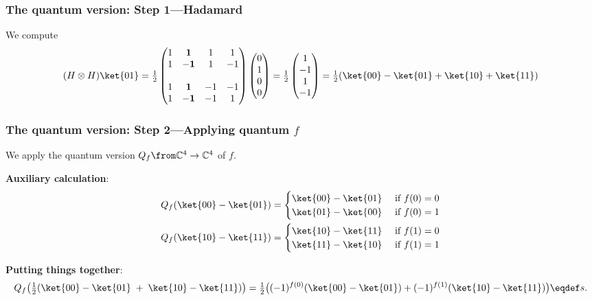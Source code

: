 \documentclass[aspectratio=169, 12pt, final, professionalfont]{beamer}
\begin{document}
\begin{frame}\frametitle{The quantum version: Step 1---Hadamard}
  We compute
  \begin{equation*}
    (H\otimes H) \ket{01}
    =
    \tfrac{1}{2}\begin{pmatrix}
      1 & \mathbf{1}  & 1  & 1 \\
      1 & \mathbf{-1} & 1  & -1 \\\\
      1 & \mathbf{1}  & -1 & -1 \\
      1 & \mathbf{-1} & -1 & 1
    \end{pmatrix}
    \begin{pmatrix}
      0 \\ 1 \\ 0 \\ 0
    \end{pmatrix}
    =\tfrac{1}{2}
    \begin{pmatrix}
      1 \\ -1 \\ 1 \\ -1
    \end{pmatrix}
    = \tfrac{1}{2}(\ket{00} - \ket{01} + \ket{10} + \ket{11})
  \end{equation*}
\end{frame}

\begin{frame}\frametitle{The quantum version: Step 2---Applying quantum \(f\)}
  We apply the quantum version \(Q_{f}\from \mathbb{C}^{4}\to \mathbb{C}^{4}\) of \(f\).

  \textbf{Auxiliary calculation}:
  \begin{align*}
    Q_{f}(\ket{00} - \ket{01}) &=
    \begin{cases}
      \ket{00} - \ket{01} & \text{ if } f(0)= 0 \\
      \ket{01} - \ket{00} & \text{ if } f(0)= 1 \\
    \end{cases} \\
    Q_{f}(\ket{10} - \ket{11}) &=
    \begin{cases}
      \ket{10} - \ket{11} & \text{ if } f(1)= 0 \\
      \ket{11} - \ket{10} & \text{ if } f(1)= 1 \\
    \end{cases}
  \end{align*}

 \textbf{Putting things together}:
 \begin{equation*}
   Q_{f}\big(\tfrac{1}{2} (\ket{00} - \ket{01} \;+\; \ket{10} - \ket{11} )\big)
   = \tfrac{1}{2} \big((-1)^{f(0)}(\ket{00} - \ket{01}) + (-1)^{f(1)}(\ket{10} - \ket{11})\big) \eqdef s.
  \end{equation*}
\end{frame}
\end{document}
